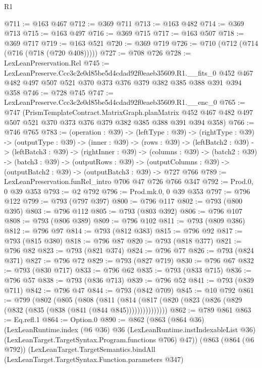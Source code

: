 \begin{lexlean}{R1}
\begin{coremodule}
@711 := @163 @467
@712 := @369 @711
@713 := @163 @482
@714 := @369 @713
@715 := @163 @497
@716 := @369 @715
@717 := @163 @507
@718 := @369 @717
@719 := @163 @521
@720 := @369 @719
@726 := @710 (@712 (@714 (@716 (@718 (@720 @408)))))
@727 := @708 @726
@728 := LexLeanPreservation.Rel
@745 := LexLeanPreserve.Ccc3c2e0d85be5d4cdad92f0eaeb35609.R1.__fits_0
    @452
    @467
    @482
    @497
    @507
    @521
    @370
    @373
    @376
    @379
    @382
    @385
    @388
    @391
    @394
    @358
@746 := @728 @745
@747 := LexLeanPreserve.Ccc3c2e0d85be5d4cdad92f0eaeb35609.R1.__enc_0
@765 := @747
    (PrismTemplateContract.MatrixGraph.planMatrix
      @452
      @467
      @482
      @497
      @507
      @521
      @370
      @373
      @376
      @379
      @382
      @385
      @388
      @391
      @394
      @358)
@766 := @746 @765
@783 := (operation : @39) ->
  (leftType : @39) ->
  (rightType : @39) ->
  (outputType : @39) ->
  (inner : @39) ->
  (rows : @39) ->
  (leftBatch2 : @39) ->
  (leftBatch3 : @39) ->
  (rightInner : @39) ->
  (columns : @39) ->
  (batch2 : @39) ->
  (batch3 : @39) ->
  (outputRows : @39) ->
  (outputColumns : @39) -> (outputBatch2 : @39) -> (outputBatch3 : @39) -> @727 @766
@789 := LexLeanPreservation.funRel_intro @706 @47 @726 @766 @347
@792 := Prod.{0, 0} @39 @353
@793 := @2 @792
@796 := Prod.mk.{0, 0} @39 @353
@797 := @796 @122
@799 := @793 (@797 @397)
@800 := @796 @117
@802 := @793 (@800 @395)
@803 := @796 @112
@805 := @793 (@803 @392)
@806 := @796 @107
@808 := @793 (@806 @389)
@809 := @796 @102
@811 := @793 (@809 @386)
@812 := @796 @97
@814 := @793 (@812 @383)
@815 := @796 @92
@817 := @793 (@815 @380)
@818 := @796 @87
@820 := @793 (@818 @377)
@821 := @796 @82
@823 := @793 (@821 @374)
@824 := @796 @77
@826 := @793 (@824 @371)
@827 := @796 @72
@829 := @793 (@827 @719)
@830 := @796 @67
@832 := @793 (@830 @717)
@833 := @796 @62
@835 := @793 (@833 @715)
@836 := @796 @57
@838 := @793 (@836 @713)
@839 := @796 @52
@841 := @793 (@839 @711)
@842 := @796 @47
@844 := @793 (@842 @709)
@845 := @10 @792
@861 := @799
    (@802
      (@805
        (@808
          (@811
            (@814 (@817 (@820 (@823 (@826 (@829 (@832 (@835 (@838 (@841 (@844 @845)))))))))))))))
@862 := @789 @861
@863 := Eq.refl.{1}
@864 := Option.{0}
@890 := @862
    (@863
      (@864 @36)
      (LexLeanRuntime.index
        (@6 @36)
        @36
        (LexLeanRuntime.instIndexableList @36)
        (LexLeanTarget.TargetSyntax.Program.functions @706)
        @47))
    (@863
      (@864 (@6 @792))
      (LexLeanTarget.TargetSemantics.bindAll
        (LexLeanTarget.TargetSyntax.Function.parameters @347)

\end{coremodule}
\end{lexlean}
